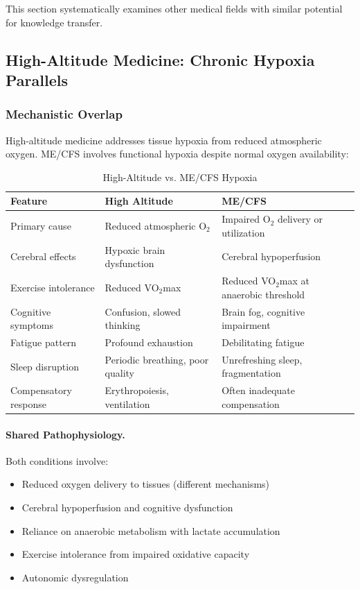 This section systematically examines other medical fields with similar potential for knowledge transfer.

\subsection{High-Altitude Medicine: Chronic Hypoxia Parallels}
\label{subsec:altitude-medicine-parallel}

\subsubsection{Mechanistic Overlap}

High-altitude medicine addresses tissue hypoxia from reduced atmospheric oxygen. ME/CFS involves functional hypoxia despite normal oxygen availability:

\begin{table}[htbp]
\centering
\caption{High-Altitude vs. ME/CFS Hypoxia}
\label{tab:altitude-mecfs-comparison}
\begin{tabular}{p{4cm}p{5cm}p{5cm}}
\toprule
\textbf{Feature} & \textbf{High Altitude} & \textbf{ME/CFS} \\
\midrule
Primary cause & Reduced atmospheric O$_2$ & Impaired O$_2$ delivery or utilization \\
Cerebral effects & Hypoxic brain dysfunction & Cerebral hypoperfusion \\
Exercise intolerance & Reduced VO$_2$max & Reduced VO$_2$max at anaerobic threshold \\
Cognitive symptoms & Confusion, slowed thinking & Brain fog, cognitive impairment \\
Fatigue pattern & Profound exhaustion & Debilitating fatigue \\
Sleep disruption & Periodic breathing, poor quality & Unrefreshing sleep, fragmentation \\
Compensatory response & Erythropoiesis, ventilation & Often inadequate compensation \\
\bottomrule
\end{tabular}
\end{table}

\paragraph{Shared Pathophysiology.}
Both conditions involve:
\begin{itemize}
    \item Reduced oxygen delivery to tissues (different mechanisms)
    \item Cerebral hypoperfusion and cognitive dysfunction
    \item Reliance on anaerobic metabolism with lactate accumulation
    \item Exercise intolerance from impaired oxidative capacity
    \item Autonomic dysregulation
\end{itemize}

